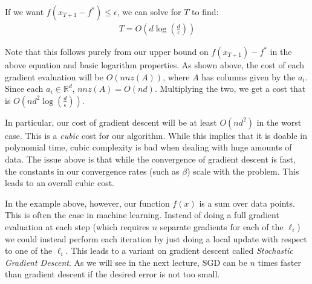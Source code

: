\documentclass[12pt]{report}
\def\real{\mathbb R}
\begin{document}
If we want $f(x_{T+1}-f^*) \leq \epsilon$, we can solve for $T$ to find:
\begin{align*}
T = O(d\log(\frac{d}{\epsilon}))\end{align*}

Note that this follows purely from our upper bound on $f(x_{T+1})-f^*$ in the above equation and basic logarithm properties. As shown above, the cost of each gradient evaluation will be $O(nnz(A))$, where $A$ has columns given by the $a_i$. Since each $a_i \in \real^d$, $nnz(A) = O(nd)$. Multiplying the two, we get a cost that is $O(nd^2\log(\frac{d}{\epsilon}))$.

\medskip

In particular, our cost of gradient descent will be at least $O(nd^2)$ in the worst case. This is a {\it cubic} cost for our algorithm. While this implies that it is doable in polynomial time, cubic complexity is bad when dealing with huge amounts of data. The issue above is that while the convergence of gradient descent is fast, the constants in our convergence rates (such as $\beta$) scale with the problem. This leads to an overall cubic cost.

\medskip

In the example above, however, our function $f(x)$ is a sum over data points. This is often the case in machine learning. Instead of doing a full gradient evaluation at each step (which requires $n$ separate gradients for each of the $\ell_i$) we could instead perform each iteration by just doing a local update with respect to one of the $\ell_i$. This leads to a variant on gradient descent called {\it Stochastic Gradient Descent}. As we will see in the next lecture, SGD can be $n$ times faster than gradient descent if the desired error is not too small.
\end{document}
